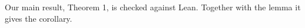 Our main result, Theorem 1, is checked  against Lean.
Together with the lemma  it gives the corollary.
